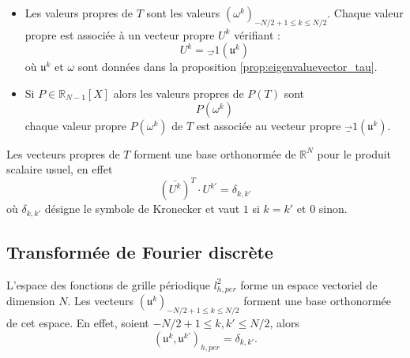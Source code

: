 \begin{corollaire}
\begin{itemize}
\item Les valeurs propres de $T$ sont les valeurs $(\omega^k)_{-N/2+1 \leq k \leq N/2}$. 
Chaque valeur propre est associée à un vecteur propre $U^k$ vérifiant :
\begin{equation}
U^k = \vec_1 (\mathfrak{u}^k )
\label{eq:eigenvectorT}
\end{equation}
où $\mathfrak{u}^k$ et $\omega$ sont données dans la proposition \ref{prop:eigenvaluevector_tau}.

\item Si $P \in \mathbb{R}_{N-1}[X]$ alors les valeurs propres de $P(T)$ sont 
\begin{equation}
P(\omega^k)
\end{equation}
chaque valeur propre $P(\omega^k)$ de $T$ est associée au vecteur propre $\vec_1 (\mathfrak{u}^k )$.
\end{itemize}
\label{prop:eigen_P(tau)}
\end{corollaire}

Les vecteurs propres de $T$ forment une base orthonormée de $\mathbb{R}^N$ pour le produit scalaire usuel, en effet
\begin{equation}
(\bar{U^k})^T \cdot U^{k'} = \delta_{k,k'}
\end{equation}
où $\delta_{k,k'}$ désigne le symbole de Kronecker et vaut $1$ si $k=k'$ et $0$ sinon.











\subsection{Transformée de Fourier discrète}

L'espace des fonctions de grille périodique $l^2_{h,per}$ forme un espace vectoriel de dimension $N$. Les vecteurs $(\mathfrak{u}^k)_{-N/2+1 \leq k \leq N/2}$ forment une base orthonormée de cet espace. En effet, soient $-N/2+1 \leq k, k' \leq N/2$, alors 
\begin{equation}
(\mathfrak{u}^k, \mathfrak{u}^{k'})_{h,per} = \delta_{k,k'}.
\end{equation}


